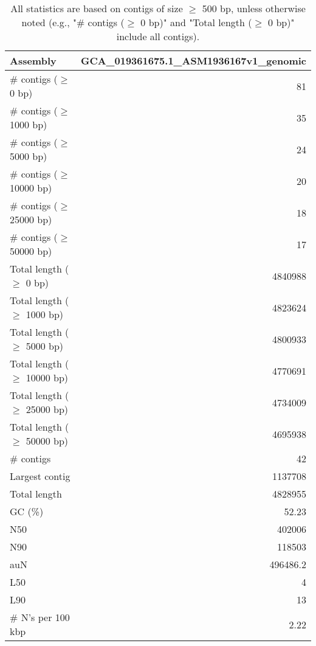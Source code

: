 \documentclass[12pt,a4paper]{article}
\begin{document}
\begin{table}[ht]
\begin{center}
\caption{All statistics are based on contigs of size $\geq$ 500 bp, unless otherwise noted (e.g., "\# contigs ($\geq$ 0 bp)" and "Total length ($\geq$ 0 bp)" include all contigs).}
\begin{tabular}{|l*{1}{|r}|}
\hline
Assembly & GCA\_019361675.1\_ASM1936167v1\_genomic \\ \hline
\# contigs ($\geq$ 0 bp) & 81 \\ \hline
\# contigs ($\geq$ 1000 bp) & 35 \\ \hline
\# contigs ($\geq$ 5000 bp) & 24 \\ \hline
\# contigs ($\geq$ 10000 bp) & 20 \\ \hline
\# contigs ($\geq$ 25000 bp) & 18 \\ \hline
\# contigs ($\geq$ 50000 bp) & 17 \\ \hline
Total length ($\geq$ 0 bp) & 4840988 \\ \hline
Total length ($\geq$ 1000 bp) & 4823624 \\ \hline
Total length ($\geq$ 5000 bp) & 4800933 \\ \hline
Total length ($\geq$ 10000 bp) & 4770691 \\ \hline
Total length ($\geq$ 25000 bp) & 4734009 \\ \hline
Total length ($\geq$ 50000 bp) & 4695938 \\ \hline
\# contigs & 42 \\ \hline
Largest contig & 1137708 \\ \hline
Total length & 4828955 \\ \hline
GC (\%) & 52.23 \\ \hline
N50 & 402006 \\ \hline
N90 & 118503 \\ \hline
auN & 496486.2 \\ \hline
L50 & 4 \\ \hline
L90 & 13 \\ \hline
\# N's per 100 kbp & 2.22 \\ \hline
\end{tabular}
\end{center}
\end{table}
\end{document}
